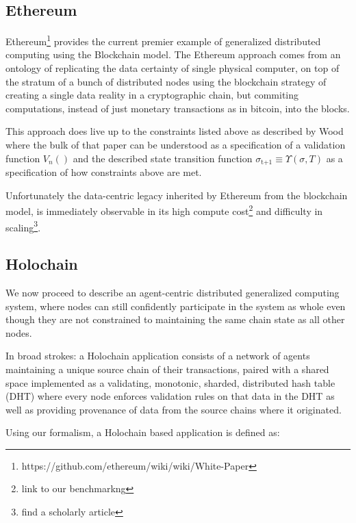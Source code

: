 \documentclass[twocolumn,showpacs,%
  nofootinbib,aps,superscriptaddress,%
  eqsecnum,prd,notitlepage,showkeys,10pt]{revtex4-1}
\begin{document}
\subsection{Ethereum}
Ethereum\footnote{https://github.com/ethereum/wiki/wiki/White-Paper} provides the current premier example of generalized distributed computing using the Blockchain model. The Ethereum approach comes from an ontology of replicating the data certainty of single physical computer, on top of the stratum of a bunch of distributed nodes using the blockchain strategy of creating a single data reality in a cryptographic chain, but commiting computations, instead of just monetary transactions as in bitcoin, into the blocks.

This approach does live up to the constraints listed above as described by Wood \cite{yellowpaper} where the bulk of that paper can be understood as a specification of a validation function $V_n()$ and the described state transition function $\sigma_\text{t+1} \equiv \Upsilon(\sigma,T)$ as a specification of how constraints above are met.

Unfortunately the data-centric legacy inherited by Ethereum from the blockchain model, is immediately observable in its high compute cost\footnote{link to our benchmarkng} and difficulty in scaling\footnote{find a scholarly article }.


\subsection{Holochain}
\label{holochain}
We now proceed to describe an agent-centric distributed generalized computing system, where nodes can still confidently participate in the system as whole even though they are not constrained to maintaining the same chain state as all other nodes.

In broad strokes: a Holochain application consists of a network of agents maintaining a unique source chain of their transactions, paired with a shared space implemented as a validating, monotonic, sharded, distributed hash table (DHT) where every node enforces validation rules on that data in the DHT as well as providing provenance of data from the source chains where it originated.

Using our formalism, a Holochain based application \shc is defined as:
\end{document}
